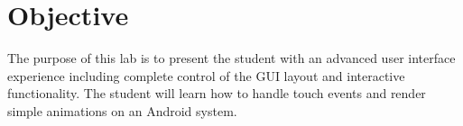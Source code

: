\section{Objective}

The purpose of this lab is to present the student with an advanced user interface experience including complete control of the GUI layout and interactive functionality.
The student will learn how to handle touch events and render simple animations on an Android system.

